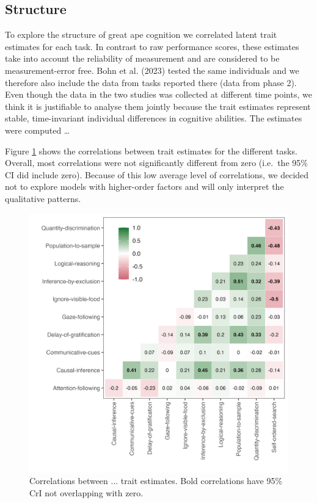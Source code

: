 \documentclass[
  man,floatsintext]{apa6}
\begin{document}
\hypertarget{structure}{%
\subsection{Structure}\label{structure}}

To explore the structure of great ape cognition we correlated latent trait estimates for each task. In contrast to raw performance scores, these estimates take into account the reliability of measurement and are considered to be measurement-error free. Bohn et al. (2023) tested the same individuals and we therefore also include the data from tasks reported there (data from phase 2). Even though the data in the two studies was collected at different time points, we think it is justifiable to analyse them jointly because the trait estimates represent stable, time-invariant individual differences in cognitive abilities. The estimates were computed \ldots{}

Figure \ref{fig:figcor} shows the correlations between trait estimates for the different tasks. Overall, most correlations were not significantly different from zero (i.e.~the 95\% CI did include zero). Because of this low average level of correlations, we decided not to explore models with higher-order factors and will only interpret the qualitative patterns.

\begin{figure}

{\centering \includegraphics[width=0.7\linewidth]{../visuals/task_level_cor} 

}

\caption{Correlations between ... trait estimates. Bold correlations have 95\% CrI not overlapping with zero.}\label{fig:figcor}
\end{figure}
\end{document}
